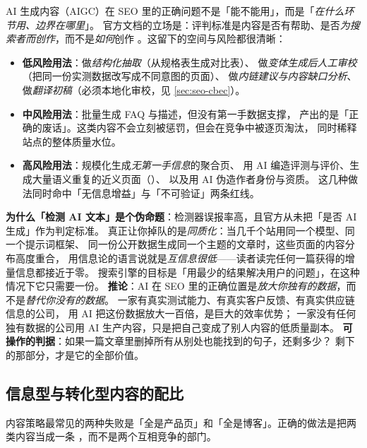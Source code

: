 AI 生成内容（AIGC）在 SEO 里的正确问题不是「能不能用」，而是「\emph{在什么环节用、边界在哪里}」。
官方文档的立场是：评判标准是内容是否有帮助、是否\emph{为搜索者而创作}，而不是\emph{如何}创作
\cite{google2024seostarter}。这留下的空间与风险都很清晰：

\begin{itemize}
  \item \textbf{低风险用法}：做\emph{结构化抽取}（从规格表生成对比表）、
        做\emph{变体生成后人工审校}（把同一份实测数据改写成不同意图的页面）、
        做\emph{内链建议与内容缺口分析}、做\emph{翻译初稿}（必须本地化审校，见 \cref{sec:seo-cbec}）。
  \item \textbf{中风险用法}：批量生成 FAQ 与描述，但没有第一手数据支撑，
        产出的是「正确的废话」。这类内容不会立刻被惩罚，但会在竞争中被逐页淘汰，
        同时稀释站点的整体质量水位。
  \item \textbf{高风险用法}：规模化生成\emph{无第一手信息}的聚合页、
        用 AI 编造评测与评价、生成大量语义重复的近义页面（）、
        以及用 AI 伪造作者身份与资质。
        这几种做法同时命中「无信息增益」与「不可验证」两条红线。
\end{itemize}

\begin{insight}
\textbf{为什么「检测 AI 文本」是个伪命题}：检测器误报率高，且官方从未把「是否 AI 生成」作为判定标准。
真正让你掉队的是\emph{同质化}：当几千个站用同一个模型、同一个提示词框架、
同一份公开数据生成同一个主题的文章时，这些页面的内容分布高度重合，
用信息论的语言说就是\emph{互信息很低}——读者读完任何一篇获得的增量信息都接近于零。
搜索引擎的目标是「用最少的结果解决用户的问题」，在这种情况下它只需要一份。
\textbf{推论}：AI 在 SEO 里的正确位置是\emph{放大你独有的数据}，而不是\emph{替代你没有的数据}。
一家有真实测试能力、有真实客户反馈、有真实供应链信息的公司，
用 AI 把这份数据放大一百倍，是巨大的效率优势；
一家没有任何独有数据的公司用 AI 生产内容，只是把自己变成了别人内容的低质量副本。
\textbf{可操作的判据}：如果一篇文章里删掉所有从别处也能找到的句子，还剩多少？
剩下的那部分，才是它的全部价值。
\end{insight}

\subsection{信息型与转化型内容的配比}

内容策略最常见的两种失败是「全是产品页」和「全是博客」。正确的做法是把两类内容当成一条
，而不是两个互相竞争的部门。

